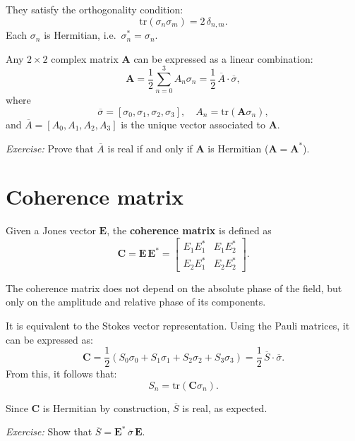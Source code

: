They satisfy the orthogonality condition:
\begin{equation}
    \mathrm{tr}(\sigma_n\sigma_m) = 2\,\delta_{n,m}.
\end{equation}
Each $\sigma_n$ is Hermitian, i.e.\ $\sigma_n^* = \sigma_n$.

Any $2\times2$ complex matrix $\mathbf{A}$ can be expressed as a linear combination:
\begin{equation}
    \mathbf{A} = \frac{1}{2}\sum_{n=0}^{3} A_n\sigma_n 
    = \frac{1}{2}\,\overline{A}\cdot\overline{\sigma},
\end{equation}
where
\[
\overline{\sigma} = [\sigma_0, \sigma_1, \sigma_2, \sigma_3],
\quad
A_n = \mathrm{tr}(\mathbf{A}\sigma_n),
\]
and $\overline{A}=[A_0,A_1,A_2,A_3]$ is the unique vector associated to $\mathbf{A}$.

\textit{Exercise:}  
Prove that $\overline{A}$ is real if and only if $\mathbf{A}$ is Hermitian ($\mathbf{A}=\mathbf{A}^*$).

\section{Coherence matrix}

Given a Jones vector $\mathbf{E}$, the \textbf{coherence matrix} is defined as
\begin{equation}
    \mathbf{C} = \mathbf{E}\,\mathbf{E}^*
    =
    \begin{bmatrix}
        E_1E_1^* & E_1E_2^*\\
        E_2E_1^* & E_2E_2^*
    \end{bmatrix}.
\end{equation}

The coherence matrix does not depend on the absolute phase of the field, but only on the amplitude and relative phase of its components.

\medskip
It is equivalent to the Stokes vector representation.  
Using the Pauli matrices, it can be expressed as:
\begin{equation}
    \mathbf{C} = \frac{1}{2}(S_0\sigma_0 + S_1\sigma_1 + S_2\sigma_2 + S_3\sigma_3)
    = \frac{1}{2}\,\overline{S}\cdot\overline{\sigma}.
\end{equation}
From this, it follows that:
\[
S_n = \mathrm{tr}(\mathbf{C}\sigma_n).
\]

Since $\mathbf{C}$ is Hermitian by construction, $\overline{S}$ is real, as expected.

\textit{Exercise:}  
Show that $\overline{S} = \mathbf{E}^*\,\overline{\sigma}\,\mathbf{E}$.

